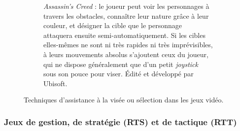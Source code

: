 \begin{appendices}
\begin{figure}[!htbp]
\begin{subfigure}[t]{0.50\textwidth}
			\caption[Système \emph{Eagle Vision} dans le jeu \emph{Assassin's Creed}] {\emph{Assassin's Creed} : le joueur peut voir les personnages à travers les obstacles, connaître leur nature grâce à leur couleur, et désigner la cible que le personnage attaquera ensuite semi-automatiquement. Si les cibles elles-mêmes ne sont ni très rapides ni très imprévisibles, à leurs mouvements absolus s'ajoutent ceux du joueur, qui ne dispose généralement que d'un petit \emph{joystick} sous son pouce pour viser. Édité et développé par Ubisoft.}
			\label{fig:ac_ev}
		\end{subfigure}
		\label{fig:gamesTargeting}
		\caption{Techniques d'assistance à la visée ou sélection dans les jeux vidéo.}
	\end{figure}
	
	
	
	
	\subsubsection{Jeux de gestion, de stratégie (RTS) et de tactique (RTT)}


\end{appendices}

